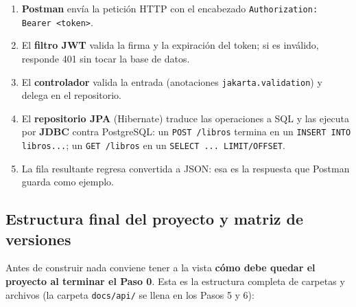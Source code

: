 \documentclass[11pt,a4paper]{article}
\begin{document}
\begin{enumerate}
  \item \textbf{Postman} envía la petición HTTP con el encabezado \texttt{Authorization: Bearer <token>}.
  \item El \textbf{filtro JWT} valida la firma y la expiración del token; si es inválido, responde 401 sin tocar la base de datos.
  \item El \textbf{controlador} valida la entrada (anotaciones \texttt{jakarta.validation}) y delega en el repositorio.
  \item El \textbf{repositorio JPA} (Hibernate) traduce las operaciones a SQL y las ejecuta por \textbf{JDBC} contra PostgreSQL: un \texttt{POST /libros} termina en un \texttt{INSERT INTO libros...}; un \texttt{GET /libros} en un \texttt{SELECT ... LIMIT/OFFSET}.
  \item La fila resultante regresa convertida a JSON: esa es la respuesta que Postman guarda como ejemplo.
\end{enumerate}

\subsection{Estructura final del proyecto y matriz de versiones}

Antes de construir nada conviene tener a la vista \textbf{cómo debe quedar el proyecto al terminar el Paso 0}. Esta es la estructura completa de carpetas y archivos (la carpeta \texttt{docs/api/} se llena en los Pasos 5 y 6):
\end{document}
